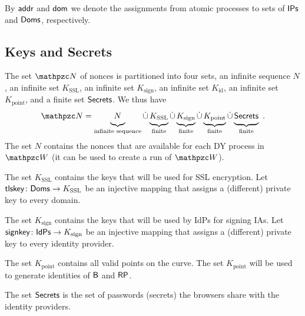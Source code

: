 \documentclass[letterpaper,onecolumn,10pt]{article}
\begin{document}
By $\mathsf{addr}$ and $\mathsf{dom}$ we denote the assignments from
atomic processes to sets of $\mathsf{IPs}$ and $\mathsf{Doms}$, respectively.

\subsection{Keys and Secrets} 
The set $\nonces$ of nonces is partitioned into four sets, 
an infinite sequence $N$, 
an infinite set $K_\text{SSL}$, 
an infinite set $K_\text{sign}$, 
an infinite set $K_\text{id}$, 
an infinite set $K_\text{point}$, 
and a finite set $\mathsf{Secrets}$. 
We thus have
\begin{align*}
\def\hereMaxHeightPhantom{\vphantom{K_{\text{p}}^\bidsystem}}
\nonces = 
\underbrace{N\hereMaxHeightPhantom}_{\text{infinite sequence}} 
\dot\cup \underbrace{K_{\text{SSL}}\hereMaxHeightPhantom}_{\text{finite}} 
\dot\cup \underbrace{K_{\text{sign}}\hereMaxHeightPhantom}_{\text{finite}}
\dot\cup \underbrace{K_{\text{point}}\hereMaxHeightPhantom}_{\text{finite}}  
\dot\cup \underbrace{\RPSecrets\hereMaxHeightPhantom}_{\text{finite}}\ .
\end{align*}
The set $N$ contains the nonces that are available for each DY process
in $\bidsystem$ (it can be used to create a run of $\bidsystem$). 

The set $K_\text{SSL}$ contains the keys that will be used for SSL
encryption. Let $\mathsf{tlskey}\colon \mathsf{Doms} \to K_\text{SSL}$ be an injective
mapping that assigns a (different) private key to every domain.

The set $K_\text{sign}$ contains the keys that will be used by IdPs
for signing IAs. Let $\mathsf{signkey}\colon \mathsf{IdPs} \to K_\text{sign}$
be an injective mapping that assigns a (different) private key to every identity
provider.

The set $K_\text{point}$ contains all valid points on the curve. 
The set $K_\text{point}$ will be used to generate identities of $\mathsf{B}$ and $\mathsf{RP}$.

The set $\mathsf{Secrets}$ is the set of passwords (secrets) 
the browsers share with the identity providers. 


\end{document}
